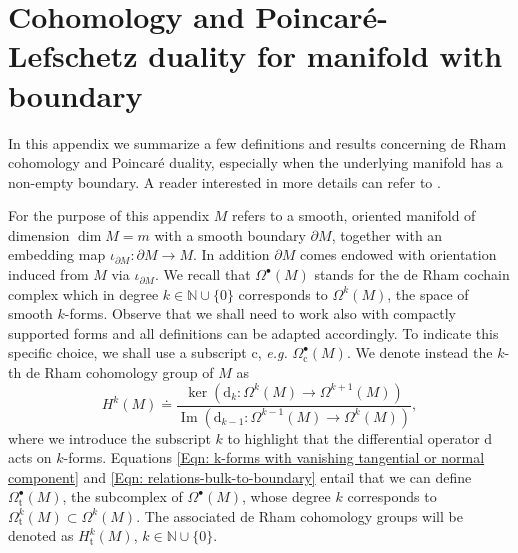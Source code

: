 

\chapter{Cohomology and Poincar\'e-Lefschetz duality for manifold with boundary}\label{App: Poincare duality for manifold with boundary}

In this appendix we summarize a few definitions and results concerning de Rham cohomology and Poincar\'e duality, especially when the underlying manifold has a non-empty boundary. A reader interested in more details can refer to \cite{Bott-Tu-82,Schwarz-95}. 

For the purpose of this appendix $M$ refers to a smooth, oriented manifold of dimension $\dim M=m$ with a smooth boundary $\partial M$, together with an embedding map $\iota_{\partial M}:\partial M\to M$. In addition $\partial M$ comes endowed with orientation induced from $M$ via $\iota_{\partial M}$. We recall that $\Omega^\bullet(M)$ stands for the de Rham cochain complex which in degree  $k\in\mathbb{N}\cup\{0\}$ corresponds to $\Omega^k(M)$, the space of smooth $k$-forms. Observe that we shall need to work also with compactly supported forms and all definitions can be adapted accordingly.
To indicate this specific choice, we shall use a subscript $\mathrm{c}$, {\it e.g.} $\Omega^\bullet_{\mathrm{c}}(M)$. We denote instead the $k$-th de Rham cohomology group of $M$ as 
\begin{equation}\label{Eqn: cohomology}
	H^k(M)\doteq\frac{\ker(\mathrm{d}_k\colon\Omega^k(M)\to\Omega^{k+1}(M))}{\operatorname{Im} (\mathrm{d}_{k-1}\colon\Omega^{k-1}(M)\to\Omega^k(M))},
\end{equation}
where we introduce the subscript $k$ to highlight that the differential operator $\mathrm{d}$ acts on $k$-forms. Equations \eqref{Eqn: k-forms with vanishing tangential or normal component} and \eqref{Eqn: relations-bulk-to-boundary} entail that we can define $\Omega^\bullet_{\mathrm{t}}(M)$, the subcomplex of $\Omega^\bullet(M)$, whose degree $k$ corresponds to $\Omega^k_{\mathrm{t}}(M)\subset\Omega^k(M)$. The associated de Rham cohomology groups will be denoted as $H^k_{\mathrm{t}}(M)$, $k\in\mathbb{N}\cup\{0\}$.

